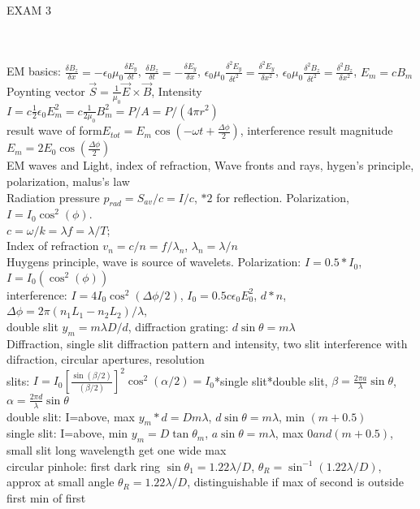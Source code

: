 \documentclass{article}
\begin{document}
\begin{large}
\begin{Large}\\EXAM 3\end{Large} 
\\
\\\indent EM basics: $\frac{\delta B_z}{\delta x}=-\epsilon_0\mu_0\frac{\delta E_y}{\delta t}$, $\frac{\delta B_z}{\delta t}=-\frac{\delta E_y}{\delta x}$, $\epsilon_0\mu_0\frac{\delta^2E_y}{\delta t^2}=\frac{\delta^2E_y}{\delta x^2}$, $\epsilon_0\mu_0\frac{\delta^2B_z}{\delta t^2}=\frac{\delta^2B_z}{\delta x^2}$, $E_m=cB_m$
\\Poynting vector $\vec S=\frac{1}{\mu_0}\vec E\times\vec B$, Intensity $I=c\frac{1}{2}\epsilon_0E_m^2=c\frac{1}{2\mu_0}B_m^2=P/A=P/(4\pi r^2)$
\\result wave of form$E_{tot}=E_m\cos(-\omega t+\frac{\Delta\phi}{2})$, interference result magnitude $E_m=2E_0\cos(\frac{\Delta\phi}{2})$
\\\indent EM waves and Light, index of refraction, Wave fronts and rays, hygen's principle, polarization, malus's law
\\Radiation pressure $p_{rad}=S_{av}/c=I/c$, $*2$ for reflection. Polarization, $I=I_0\cos^2(\phi)$. 
\\$c=\omega/k=\lambda f=\lambda/T$;\\Index of refraction $v_n=c/n=f/\lambda_n$, $\lambda_n=\lambda/n$ 
\\Huygens principle, wave is source of wavelets. Polarization: $I=0.5*I_0$, $I=I_0(\cos^2(\phi))$
\\\indent interference: $I=4I_0\cos^2(\Delta\phi/2)$, $I_0=0.5 c \epsilon_0E_0^2$, $d*n$, $\Delta\phi=2\pi(n_1L_1-n_2L_2)/\lambda$,
\\double slit $y_m=m\lambda D/d$, diffraction grating: $d\sin\theta=m\lambda$
\\\indent Diffraction, single slit diffraction pattern and intensity, two slit interference with difraction, circular apertures, resolution
\\slits: $I=I_0[\frac{\sin(\beta/2)}{(\beta/2)}]^2\cos^2(\alpha/2)=I_0$*single slit*double slit, $\beta=\frac{2\pi a}{\lambda}\sin\theta$, $\alpha=\frac{2\pi d}{\lambda}\sin\theta$
\\double slit: I=above, max $y_m*d=Dm\lambda$, $d\sin\theta=m\lambda$, min $(m+0.5)$
\\single slit: I=above, min $y_m=D\tan\theta_m$, $a\sin\theta=m\lambda$, max $0 and (m+0.5)$, small slit long wavelength get one wide max
\\circular pinhole: first dark ring $\sin\theta_1=1.22\lambda/D$, $\theta_R=\sin^{-1}(1.22\lambda/D)$, approx at small angle $\theta_R=1.22\lambda/D$, distinguishable if max of second is outside first min of first

\end{large}
\end{document}
